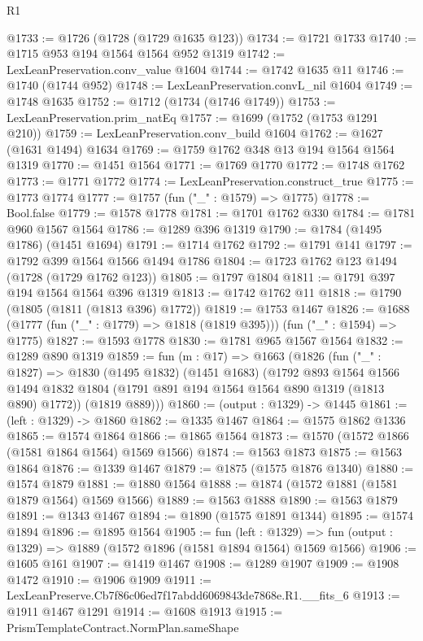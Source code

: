\begin{lexlean}{R1}
\begin{coremodule}
@1733 := @1726 (@1728 (@1729 @1635 @123))
@1734 := @1721 @1733
@1740 := @1715 @953 @194 @1564 @1564 @952 @1319
@1742 := LexLeanPreservation.conv_value @1604
@1744 := @1742 @1635 @11
@1746 := @1740 (@1744 @952)
@1748 := LexLeanPreservation.convL_nil @1604
@1749 := @1748 @1635
@1752 := @1712 (@1734 (@1746 @1749))
@1753 := LexLeanPreservation.prim_natEq
@1757 := @1699 (@1752 (@1753 @1291 @210))
@1759 := LexLeanPreservation.conv_build @1604
@1762 := @1627 (@1631 @1494) @1634
@1769 := @1759 @1762 @348 @13 @194 @1564 @1564 @1319
@1770 := @1451 @1564
@1771 := @1769 @1770
@1772 := @1748 @1762
@1773 := @1771 @1772
@1774 := LexLeanPreservation.construct_true
@1775 := @1773 @1774
@1777 := @1757 (fun ("_" : @1579) => @1775)
@1778 := Bool.false
@1779 := @1578 @1778
@1781 := @1701 @1762 @330
@1784 := @1781 @960 @1567 @1564
@1786 := @1289 @396 @1319
@1790 := @1784 (@1495 @1786) (@1451 @1694)
@1791 := @1714 @1762
@1792 := @1791 @141
@1797 := @1792 @399 @1564 @1566 @1494 @1786
@1804 := @1723 @1762 @123 @1494 (@1728 (@1729 @1762 @123))
@1805 := @1797 @1804
@1811 := @1791 @397 @194 @1564 @1564 @396 @1319
@1813 := @1742 @1762 @11
@1818 := @1790 (@1805 (@1811 (@1813 @396) @1772))
@1819 := @1753 @1467
@1826 := @1688 (@1777 (fun ("_" : @1779) => @1818 (@1819 @395))) (fun ("_" : @1594) => @1775)
@1827 := @1593 @1778
@1830 := @1781 @965 @1567 @1564
@1832 := @1289 @890 @1319
@1859 := fun (m : @17) =>
  @1663
    (@1826
      (fun ("_" : @1827) =>
      @1830
        (@1495 @1832)
        (@1451 @1683)
        (@1792
          @893
          @1564
          @1566
          @1494
          @1832
          @1804
          (@1791 @891 @194 @1564 @1564 @890 @1319 (@1813 @890) @1772))
        (@1819 @889)))
@1860 := (output : @1329) -> @1445
@1861 := (left : @1329) -> @1860
@1862 := @1335 @1467
@1864 := @1575 @1862 @1336
@1865 := @1574 @1864
@1866 := @1865 @1564
@1873 := @1570 (@1572 @1866 (@1581 @1864 @1564) @1569 @1566)
@1874 := @1563 @1873
@1875 := @1563 @1864
@1876 := @1339 @1467
@1879 := @1875 (@1575 @1876 @1340)
@1880 := @1574 @1879
@1881 := @1880 @1564
@1888 := @1874 (@1572 @1881 (@1581 @1879 @1564) @1569 @1566)
@1889 := @1563 @1888
@1890 := @1563 @1879
@1891 := @1343 @1467
@1894 := @1890 (@1575 @1891 @1344)
@1895 := @1574 @1894
@1896 := @1895 @1564
@1905 := fun (left : @1329) =>
  fun (output : @1329) => @1889 (@1572 @1896 (@1581 @1894 @1564) @1569 @1566)
@1906 := @1605 @161
@1907 := @1419 @1467
@1908 := @1289 @1907
@1909 := @1908 @1472
@1910 := @1906 @1909
@1911 := LexLeanPreserve.Cb7f86c06ed7f17abdd6069843de7868e.R1.__fits_6
@1913 := @1911 @1467 @1291
@1914 := @1608 @1913
@1915 := PrismTemplateContract.NormPlan.sameShape

\end{coremodule}
\end{lexlean}
